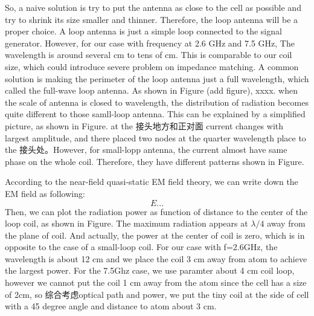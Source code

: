 So, a naive solution is try to put the antenna as close to the cell as possible and try to shrink its size smaller and thinner. Therefore, the loop antenna will be a proper choice. A loop antenna is just a simple loop connected to the signal generator. However, for our case with frequency at 2.6 GHz and 7.5 GHz, The wavelength is around several cm to tens of cm. This is comparable to our coil size, which could introduce severe problem on impedance matching. A common solution is making the perimeter of the loop antenna just a full wavelength, which called the full-wave loop antenna. As shown in Figure (add figure), xxxx. when the scale of antenna is closed to wavelength, the distribution of radiation becomes quite different to those samll-loop antenna. This can be explained by a simplified picture, as shown in Figure. at the 接头地方和正对面 current changes with largest amplitude, and there placed two nodes at the quarter wavelength place to the 接头处。However, for small-lopp antenna, the current almost have same phase on the whole coil. Therefore, they have different patterns shown in Figure.

According to the near-field quasi-static EM field theory, we can write down the EM field as following:
\begin{equation}
    E...
\end{equation}
Then, we can plot the radiation power as function of distance to the center of the loop coil, as shown in Figure. The maximum radiation appears at \(\lambda/4\) away from the plane of coil. And actually, the power at the center of coil is zero, which is in opposite to the case of a small-loop coil. For our case with f=2.6GHz, the wavelength is about 12 cm and we place the coil 3 cm away from atom to achieve the largest power. For the 7.5Ghz case, we use paramter about 4 cm coil loop, however we cannot put the coil 1 cm away from the atom since the cell has a size of 2cm, so 综合考虑optical path and power, we put the tiny coil at the side of cell with a 45 degree angle and distance to atom about 3 cm. 

